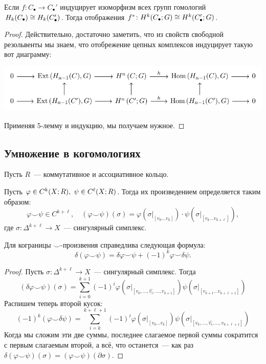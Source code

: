     \begin{corollary}
        Если $f\colon C_{\bullet} \to C_{\bullet}'$ индуцирует изоморфизм всех групп гомологий $H_{k}(C_{\bullet}) \cong H_{k}\lr*{C_{\bullet}'}$.
        Тогда отображения $f^{*}\colon H^{k}\lr*{C_{\bullet}; G} \cong H^{k}\lr*{C_{\bullet}'; G}$.
    \end{corollary}
    \begin{proof}
        Действительно, достаточно заметить, что из свойств свободной резольвенты мы знаем, что отобрежение цепных комплексов индуцирует такую вот диаграмму:
        \begin{center}
            \includegraphics{lectures/0/pictures/cd_14}
        \end{center}
        Применяя 5-лемму и индукцию, мы получаем нужное.
    \end{proof}

    \subsection{Умножение в когомологиях}

    Пусть $R$~--- коммутативное и ассоциативное кольцо.

    Пусть $\varphi \in C^{k}\lr*{X; R}, \ \psi \in C^{\ell}\lr*{X; R}$. Тогда их произведением определяется таким образом:
    \[ \varphi \smile \psi \in C^{k + \ell}, \quad (\varphi \smile \psi)(\sigma) = \varphi(\sigma\vert_{[v_0 \ldots v_k]}) \cdot \psi(\sigma\vert_{[v_k \ldots v_{k + \ell}]}), \]
    где $\sigma\colon \Delta^{k + \ell} \to X$~--- сингулярный симплекс.

    \begin{lemma}
        Для кограницы $\smile$-произвения справедлива следующая формула:
        \[ \delta(\varphi \smile \psi) = \delta \varphi \smile \psi + (-1)^k \varphi \smile \delta \psi. \]
    \end{lemma}

    \begin{proof}
        Пусть $\sigma\colon \Delta^{k + \ell} \to X$~--- сингулярный симплекс. Тогда
        \[ (\delta \varphi \smile \psi)(\sigma) = \sum_{i = 0}^{k + 1} (-1)^{i} \varphi(\sigma\vert_{[v_0, \ldots, \hat{v_i}, \ldots, v_{k + 1}]}) \psi(\sigma\vert_{[v_{k + 1} \ldots v_{k + \ell + 1}]})\]
        Распишем теперь второй кусок:
        \[ (-1)^k (\varphi \smile \delta \psi) = \sum_{i = k}^{k + \ell + 1} (-1)^i \varphi(\sigma\vert_{[v_0 \ldots v_k]}) \psi(\sigma\vert_{[v_{k}, \ldots, \hat{v_i}, \ldots, v_{k + \ell + 1}]}) \]
        Когда мы сложим эти две суммы, последнее слагаемое первой суммы сократится с первым слагаемым второй, а всё, что останется~--- как раз $\delta(\varphi \smile \psi)(\sigma) = (\varphi \smile \psi)(\partial \sigma)$.
    \end{proof}
    
